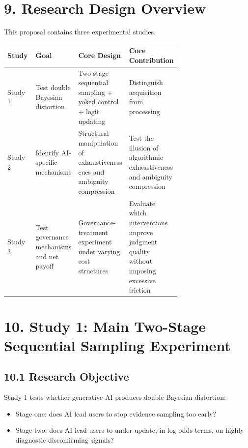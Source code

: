 \section*{9. Research Design Overview}

This proposal contains three experimental studies.

\begin{center}
\begin{tabularx}{\linewidth}{>{\raggedright\arraybackslash}p{0.17\linewidth} >{\raggedright\arraybackslash}p{0.24\linewidth} >{\raggedright\arraybackslash}p{0.29\linewidth} >{\raggedright\arraybackslash}X}
\toprule
\textbf{Study} & \textbf{Goal} & \textbf{Core Design} & \textbf{Core Contribution} \\
\midrule
Study 1 & Test double Bayesian distortion & Two-stage sequential sampling + yoked control + logit updating & Distinguish acquisition from processing \\
Study 2 & Identify AI-specific mechanisms & Structural manipulation of exhaustiveness cues and ambiguity compression & Test the illusion of algorithmic exhaustiveness and ambiguity compression \\
Study 3 & Test governance mechanisms and net payoff & Governance-treatment experiment under varying cost structures & Evaluate which interventions improve judgment quality without imposing excessive friction \\
\bottomrule
\end{tabularx}
\end{center}

\section*{10. Study 1: Main Two-Stage Sequential Sampling Experiment}

\subsection*{10.1 Research Objective}

Study 1 tests whether generative AI produces double Bayesian distortion:
\begin{itemize}[leftmargin=1.5em]
\item Stage one: does AI lead users to stop evidence sampling too early?
\item Stage two: does AI lead users to under-update, in log-odds terms, on highly diagnostic disconfirming signals?
\end{itemize}

